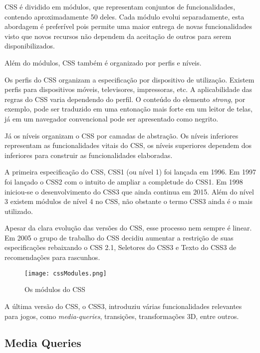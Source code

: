 CSS é dividido em módulos, que representam conjuntos de
funcionalidades, contendo aproximadamente 50 deles. Cada módulo evolui
separadamente, esta abordagem é preferível pois permite uma maior
entrega de novas funcionalidades visto que novos recursos não dependem
da aceitação de outros para serem disponibilizados.

Além do módulos, CSS também é organizado por perfis e níveis.

Os perfis do CSS organizam a especificação por dispositivo de
utilização. Existem perfis para dispositivos móveis, televisores,
impressoras, etc. A aplicabilidade das regras do CSS varia dependendo do
perfil. O conteúdo do elemento \textit{strong}, por exemplo, pode ser
traduzido em uma entonação mais forte em um leitor de telas, já em um
navegador convencional pode ser apresentado como negrito.

Já os níveis organizam o CSS por camadas de abstração. Os níveis
inferiores representam as funcionalidades vitais do CSS, os níveis
superiores dependem dos inferiores para construir as funcionalidades
elaboradas. %

A primeira especificação do CSS, CSS1 (ou nível 1) foi lançada em
1996. Em 1997 foi lançado o CSS2 com o intuito de ampliar a completude
do CSS1. Em 1998 iniciou-se o desenvolvimento do CSS3 que ainda continua
em 2015. Além do nível 3 existem módulos de nível 4 no CSS, não
obstante o termo CSS3 ainda é o mais utilizado.

Apesar da clara evolução das versões do CSS, esse processo nem
sempre é linear. Em 2005 o grupo de trabalho do CSS decidiu aumentar a
restrição de suas especificações rebaixando o CSS 2.1, Seletores do
CSS3 e Texto do CSS3 de recomendações para rascunhos.

\begin{figure}
    \centering
    \texttt{[image: cssModules.png]}
    \caption{Os módulos do CSS}
\end{figure}

A última versão do CSS, o CSS3, introduziu várias funcionalidades
relevantes para jogos, como \textit{media-queries}, transições,
transformações 3D, entre outros.

\subsection{Media Queries}

